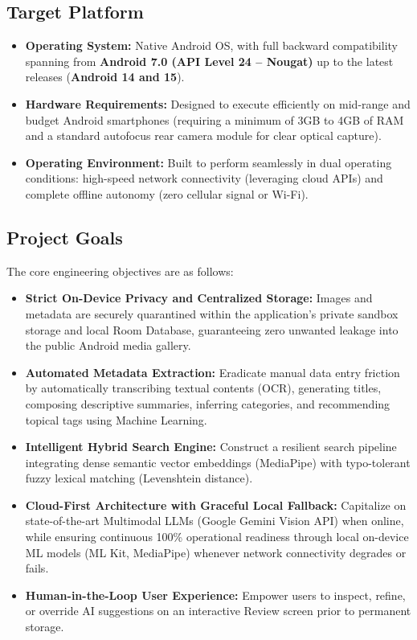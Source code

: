 \subsection{Target Platform}
\begin{itemize}
    \item \textbf{Operating System:} Native Android OS, with full backward compatibility spanning from \textbf{Android 7.0 (API Level 24 -- Nougat)} up to the latest releases (\textbf{Android 14 and 15}).
    \item \textbf{Hardware Requirements:} Designed to execute efficiently on mid-range and budget Android smartphones (requiring a minimum of 3GB to 4GB of RAM and a standard autofocus rear camera module for clear optical capture).
    \item \textbf{Operating Environment:} Built to perform seamlessly in dual operating conditions: high-speed network connectivity (leveraging cloud APIs) and complete offline autonomy (zero cellular signal or Wi-Fi).
\end{itemize}

\subsection{Project Goals}
The core engineering objectives are as follows:
\begin{itemize}
    \item \textbf{Strict On-Device Privacy and Centralized Storage:} Images and metadata are securely quarantined within the application's private sandbox storage and local Room Database, guaranteeing zero unwanted leakage into the public Android media gallery.
    \item \textbf{Automated Metadata Extraction:} Eradicate manual data entry friction by automatically transcribing textual contents (OCR), generating titles, composing descriptive summaries, inferring categories, and recommending topical tags using Machine Learning.
    \item \textbf{Intelligent Hybrid Search Engine:} Construct a resilient search pipeline integrating dense semantic vector embeddings (MediaPipe) with typo-tolerant fuzzy lexical matching (Levenshtein distance).
    \item \textbf{Cloud-First Architecture with Graceful Local Fallback:} Capitalize on state-of-the-art Multimodal LLMs (Google Gemini Vision API) when online, while ensuring continuous 100\% operational readiness through local on-device ML models (ML Kit, MediaPipe) whenever network connectivity degrades or fails.
    \item \textbf{Human-in-the-Loop User Experience:} Empower users to inspect, refine, or override AI suggestions on an interactive Review screen prior to permanent storage.
\end{itemize}

